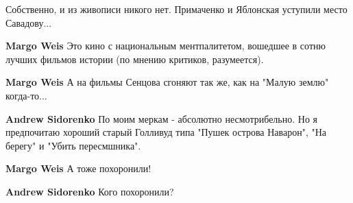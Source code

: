 \begin{itemize}
\begin{itemize}
Собственно, и из живописи никого нет. Примаченко и Яблонская уступили место Савадову...

 
\textbf{Margo Weis} Это кино с национальным ментпалитетом, вошедшее в сотню лучших фильмов истории (по мнению критиков, разумеется).

 
\textbf{Margo Weis} А на фильмы Сенцова сгоняют так же, как на "Малую землю" когда-то...

 
\textbf{Andrew Sidorenko} По моим меркам - абсолютно несмотрибельно. Но я предпочитаю хороший старый Голливуд типа "Пушек острова Наварон", "На берегу" и "Убить пересмшника".

 
\textbf{Margo Weis} А тоже похоронили!

 
\textbf{Andrew Sidorenko} Кого похоронили?

 

\end{itemize}
\end{itemize}
